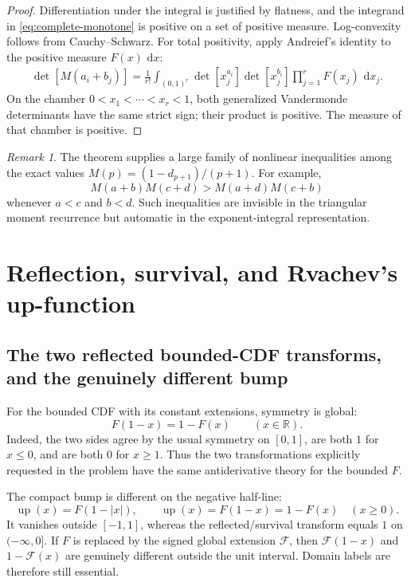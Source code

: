 \documentclass[11pt,oneside]{article}
\numberwithin{equation}{section}
\theoremstyle{definition}
\theoremstyle{remark}
\newtheorem{remark}[theorem]{Remark}
\newcommand{\R}{\mathbb R}
\newcommand{\Up}{\operatorname{up}}
\newcommand{\dd}{\,\mathrm d}
\begin{document}
\begin{proof}
Differentiation under the integral is justified by flatness, and the integrand in
\eqref{eq:complete-monotone} is positive on a set of positive measure.  Log-convexity follows
from Cauchy--Schwarz.  For total positivity, apply Andreief's identity to the positive
measure $F(x)\,\dd x$:
\begin{align*}
 \det[M(a_i+b_j)]
 =\frac1{r!}\int_{(0,1)^r}
 \det[x_j^{a_i}]\det[x_j^{b_i}]\prod_{j=1}^rF(x_j)\,\dd x_j.
\end{align*}
On the chamber $0<x_1<\cdots<x_r<1$, both generalized Vandermonde determinants have the
same strict sign; their product is positive.  The measure of that chamber is positive.
\end{proof}

\begin{remark}
The theorem supplies a large family of nonlinear inequalities among the exact values
$M(p)=(1-d_{p+1})/(p+1)$.  For example,
\[
 M(a+b)M(c+d)>M(a+d)M(c+b)
\]
whenever $a<c$ and $b<d$.  Such inequalities are invisible in the triangular moment
recurrence but automatic in the exponent-integral representation.
\end{remark}

\section{Reflection, survival, and Rvachev's up-function}
\label{sec:up}

\subsection{The two reflected bounded-CDF transforms, and the genuinely different bump}

For the bounded CDF with its constant extensions, symmetry is global:
\begin{equation}
 F(1-x)=1-F(x)\qquad(x\in\R).                                \label{eq:reflected-global}
\end{equation}
Indeed, the two sides agree by the usual symmetry on $[0,1]$, are both $1$ for $x\le0$,
and are both $0$ for $x\ge1$.  Thus the two transformations explicitly requested in the
problem have the same antiderivative theory for the bounded $F$.

The compact bump is different on the negative half-line:
\begin{equation}
 \Up(x)=F(1-|x|),\qquad
 \Up(x)=F(1-x)=1-F(x)\quad(x\ge0).                            \label{eq:three-agree}
\end{equation}
It vanishes outside $[-1,1]$, whereas the reflected/survival transform equals $1$ on
$(-\infty,0]$.  If $F$ is replaced by the signed global extension $\mathcal F$, then
$\mathcal F(1-x)$ and $1-\mathcal F(x)$ are genuinely different outside the unit interval.
Domain labels are therefore still essential.
\end{document}
